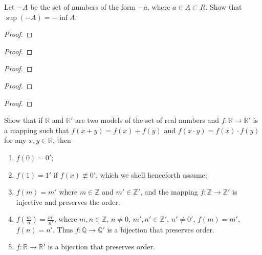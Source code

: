 \begin{exercise}
    Let $-A$ be the set of numbers of the form $-a$, where $a \in A \subset R$. Show that $\sup(-A) = -\inf A$.
\end{exercise}

\begin{proof}
\end{proof}
\newpage

\begin{exercise}
\end{exercise}

\begin{proof}
\end{proof}
\newpage

\begin{exercise}
\end{exercise}

\begin{proof}
\end{proof}
\newpage

\begin{exercise}
\end{exercise}

\begin{proof}
\end{proof}
\newpage

\begin{exercise}
\end{exercise}

\begin{proof}
\end{proof}
\newpage

\begin{exercise}
    Show that if $\mathbb{R}$ and $\mathbb{R}'$ are two models of the set of real numbers and $f: \mathbb{R}\to \mathbb{R}'$ is a mapping such that $f(x + y) = f(x) + f(y)$ and $f(x\cdot y) = f(x)\cdot f(y)$ for any $x, y\in \mathbb{R}$, then
    \begin{enumerate}[label={(\alph*)}]
        \item $f(0) = 0'$;
        \item $f(1) = 1'$ if $f(x)\not\equiv 0'$, which we shell henceforth assume;
        \item $f(m) = m'$ where $m\in\mathbb{Z}$ and $m'\in\mathbb{Z}'$, and the mapping $f: \mathbb{Z}\to \mathbb{Z}'$ is injective and preserves the order.
        \item $f(\frac{m}{n}) = \frac{m'}{n'}$, where $m, n\in\mathbb{Z}$, $n\ne 0$, $m',n'\in\mathbb{Z}'$, $n'\ne 0'$, $f(m) = m'$, $f(n) = n'$. Thus $f: \mathbb{Q}\to \mathbb{Q}'$ is a bijection that preserves order.
        \item $f: \mathbb{R}\to \mathbb{R}'$ is a bijection that preserves order.
    \end{enumerate}
\end{exercise}

